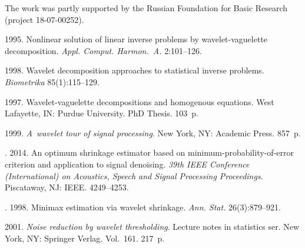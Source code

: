 



\vspace*{-14pt}

\Ack
\noindent
The work was partly supported by the Russian Foundation for Basic Research 
(project 18-07-00252).




  \begin{multicols}{2}

\renewcommand{\bibname}{\protect\rmfamily References}

{\small\frenchspacing
 {%
 \begin{thebibliography}{99}



 1995. Nonlinear solution of linear inverse problems by 
wavelet-vaguelette decomposition. \textit{Appl. Comput. Harmon.~A.} 2:101--126.

 1998. 
Wavelet decomposition approaches to statistical inverse problems. 
\textit{Biometrika} 85(1):115--129.

 1997. Wavelet-vaguelette decompositions and homogenous equations.
 West Lafayette, IN: Purdue University. PhD Thesis. 103~p.

 1999. \textit{A~wavelet tour of signal processing}. 
New York, NY: Academic Press. 857~p.

. 2014. 
An optimum shrinkage estimator based on minimum-probability-of-error 
criterion and application to signal denoising. 
\textit{39th IEEE  Conference (International) on Acoustics, 
    Speech and Signal Processing Proceedings}. Piscataway, NJ: IEEE. 4249--4253.

. 1998. Minimax estimation via wavelet shrinkage. 
\textit{Ann. Stat.} 26(3):879--921.

 2001. \textit{Noise reduction by wavelet thresholding}. 
Lecture notes in statistics ser. New York, NY: Springer Verlag. Vol.~161. 217~p.


\end{thebibliography}}}
\end{multicols}

